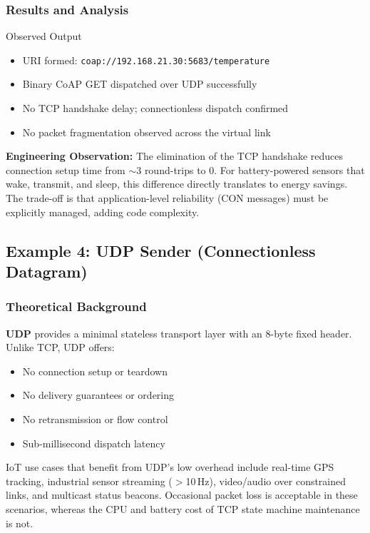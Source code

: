 \documentclass[12pt,a4paper]{article}
\begin{document}
\subsubsection*{Results and Analysis}

\begin{resultblock}{Observed Output}
\begin{itemize}[nosep]
  \item URI formed: \texttt{coap://192.168.21.30:5683/temperature}
  \item Binary CoAP GET dispatched over UDP successfully
  \item No TCP handshake delay; connectionless dispatch confirmed
  \item No packet fragmentation observed across the virtual link
\end{itemize}
\end{resultblock}

\textbf{Engineering Observation:} The elimination of the TCP handshake
reduces connection setup time from $\sim$3 round-trips to 0. For
battery-powered sensors that wake, transmit, and sleep, this difference
directly translates to energy savings. The trade-off is that application-level
reliability (CON messages) must be explicitly managed, adding code complexity.

\subsection{Example 4: UDP Sender (Connectionless Datagram)}
\label{sec:udp}

\subsubsection*{Theoretical Background}

\textbf{UDP} provides a minimal stateless transport layer with an 8-byte
fixed header. Unlike TCP, UDP offers:
\begin{itemize}[nosep]
  \item No connection setup or teardown
  \item No delivery guarantees or ordering
  \item No retransmission or flow control
  \item Sub-millisecond dispatch latency
\end{itemize}

IoT use cases that benefit from UDP's low overhead include real-time GPS
tracking, industrial sensor streaming ($>$10\,Hz), video/audio over constrained
links, and multicast status beacons. Occasional packet loss is acceptable in
these scenarios, whereas the CPU and battery cost of TCP state machine
maintenance is not.
\end{document}
